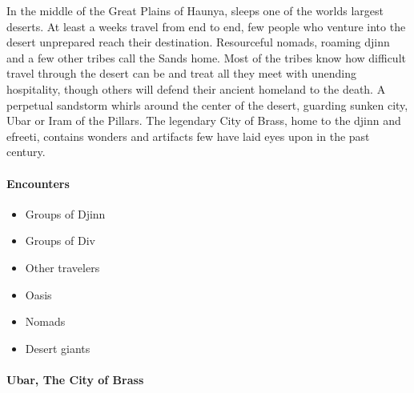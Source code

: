 		In the middle of the Great Plains of Haunya, sleeps one of the
		worlds largest deserts. At least a weeks travel from end to end,
		few people who venture into the desert unprepared reach their 
		destination.  Resourceful nomads, roaming djinn and a few other
		tribes call the Sands home.  Most of the tribes know how difficult
		travel through the desert can be and treat all they meet with 
		unending hospitality, though others will defend their ancient 
		homeland to the death.  A perpetual sandstorm whirls around the
		center of the desert, guarding sunken city, Ubar or Iram of the 
		Pillars.  The legendary City of Brass, home to the djinn and
		efreeti, contains wonders and artifacts few have laid eyes upon
		in the past century.  

		\paragraph{Encounters}
			\begin{itemize}
				\item Groups of Djinn
				\item Groups of Div
				\item Other travelers
				\item Oasis 
				\item Nomads
				\item Desert giants
			\end{itemize}
		
		\paragraph{Ubar, The City of Brass}
